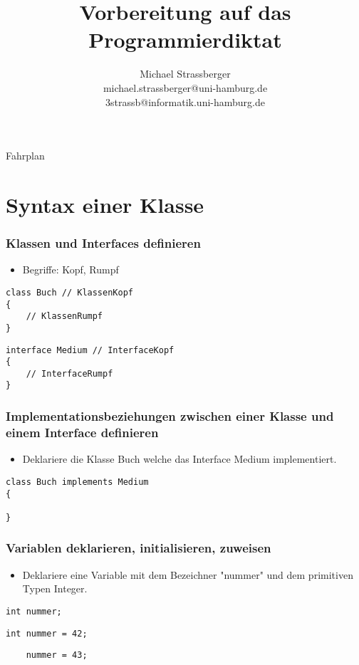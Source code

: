 \documentclass[mathserif]{beamer}
\title{Vorbereitung auf das Programmierdiktat}
\author{Michael Strassberger\\michael.strassberger@uni-hamburg.de\\3strassb@informatik.uni-hamburg.de}
\begin{document}
\begin{frame}
\titlepage
\end{frame}

\begin{frame}{Fahrplan}
\tableofcontents
\end{frame}

\section{Syntax einer Klasse}

\begin{frame}[fragile]
\frametitle{Klassen und Interfaces definieren}
\begin{itemize}
    \item Begriffe: Kopf, Rumpf
\end{itemize}
\pause  
    \begin{lstlisting}
class Buch // KlassenKopf
{
    // KlassenRumpf
}
    \end{lstlisting}
\pause
    \begin{lstlisting}
interface Medium // InterfaceKopf
{
    // InterfaceRumpf
}
    \end{lstlisting}
\end{frame}

\begin{frame}[fragile]
\frametitle{Implementationsbeziehungen zwischen einer Klasse und einem Interface definieren}
\begin{itemize}
    \item Deklariere die Klasse Buch welche das Interface Medium implementiert.
\end{itemize}
\pause
    \begin{lstlisting}
class Buch implements Medium 
{

}
    \end{lstlisting}
\end{frame}

\begin{frame}[fragile]
\frametitle{Variablen deklarieren, initialisieren, zuweisen}
\begin{itemize}
    \item Deklariere eine Variable mit dem Bezeichner "nummer" und dem primitiven Typen Integer.
\end{itemize}
\pause
    \begin{lstlisting}
int nummer;
    \end{lstlisting}
\pause
    \begin{lstlisting}
int nummer = 42;
    \end{lstlisting}
\pause
    \begin{lstlisting}
    nummer = 43;
    \end{lstlisting}
\end{frame}
\end{document}
